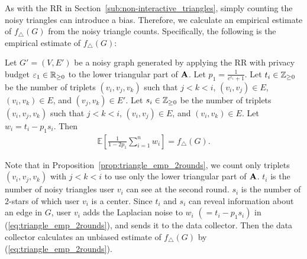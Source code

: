 As with the RR in Section~\ref{sub:non-interactive_triangles}, simply counting the noisy triangles can introduce a bias. 
Therefore, we calculate an empirical estimate of $f_\triangle(G)$ from the noisy triangle counts. 
Specifically, 
the following is the empirical estimate of $f_\triangle(G)$: 

\begin{proposition}\label{prop:triangle_emp_2rounds}
  Let $G'=(V,E')$ be a noisy graph generated by applying the RR with privacy budget $\varepsilon_1 \in \mathbb{R}_{\ge0}$   to the lower triangular part of $\mathbf{A}$.
  Let $p_1 = \frac{1}{e^{\epsilon_1}+1}$. 
  Let $t_i \in \mathbb{Z}_{\ge0}$ be the number of triplets $(v_i, v_j, v_k)$ such that 
  $j < k < i$, 
  $(v_i,v_j) \in E$, $(v_i,v_k) \in E$, and $(v_j,v_k) \in E'$.
  Let $s_i \in \mathbb{Z}_{\ge0}$ be the number of triplets $(v_i, v_j, v_k)$ such that 
  $j < k < i$, 
  $(v_i,v_j) \in E$, and $(v_i,v_k) \in E$. 
  Let $w_i = t_i - p_1 s _i$. 
  Then 
  \begin{align}
      \textstyle{\mathbb{E}\left[ \frac{1}{1-2p_1} \sum_{i=1}^n w_i \right] = f_\triangle(G).}
      \label{eq:triangle_emp_2rounds}
  \end{align}
\end{proposition}

Note that in Proposition~\ref{prop:triangle_emp_2rounds}, 
we count only triplets $(v_i, v_j, v_k)$ with 
$j < k < i$ 
to use only the lower triangular part of $\mathbf{A}$. 
$t_i$ is the number of noisy triangles user $v_i$ can see at the second round. 
$s_i$ is the number of $2$-stars of which user $v_i$ is a center. 
Since $t_i$ and $s_i$ can reveal information about an edge in $G$, user $v_i$ adds the Laplacian noise to $w_i$ $(= t_i - p_1 s _i)$ in (\ref{eq:triangle_emp_2rounds}), and sends it to the data collector. 
Then the data collector calculates an unbiased estimate of $f_\triangle(G)$ by (\ref{eq:triangle_emp_2rounds}). 

